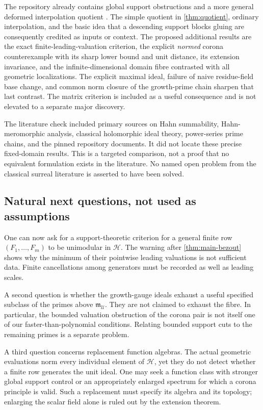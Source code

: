 \documentclass[11pt,letterpaper]{article}
\numberwithin{equation}{section}
\theoremstyle{definition}
\theoremstyle{remark}
\newcommand{\HH}{\mathcal H}
\newcommand{\UU}{\mathcal U}
\newcommand{\mm}{\mathfrak m}
\begin{document}
The repository already contains global support obstructions and a more
general deformed interpolation quotient \cite{RepoGlobal}. The simple
quotient in \cref{thm:quotient}, ordinary interpolation, and the basic
idea that a descending support blocks gluing are consequently credited
as inputs or context. The proposed additional results are the exact
finite-leading-valuation criterion, the explicit \emph{normed} corona
counterexample with its sharp lower bound and unit distance, its
extension invariance, and the infinite-dimensional domain fibre
contrasted with all geometric localizations. The explicit maximal
ideal, failure of naive residue-field base change, and common norm
closure of the growth-prime chain sharpen that last contrast. The matrix criterion is included as
a useful consequence and is not elevated to a separate major discovery.

The literature check included primary sources on Hahn summability,
Hahn-meromorphic analysis, classical holomorphic ideal theory,
power-series prime chains, and the pinned repository documents. It did
not locate these precise fixed-domain results. This is a targeted
comparison, not a proof that no equivalent formulation exists in the
literature. No named open problem from the classical surreal literature
is asserted to have been solved.

\subsection{Natural next questions, not used as assumptions}
One can now ask for a support-theoretic criterion for a general finite
row $(F_1,\ldots,F_m)$ to be unimodular in $\HH$. The warning after
\cref{thm:main-bezout} shows why the minimum of their pointwise leading
valuations is not sufficient data. Finite cancellations among generators
must be recorded as well as leading scales.

A second question is whether the growth-gauge ideals exhaust a useful
specified subclass of the primes above $\mm_\UU$. They are not claimed
to exhaust the fibre. In particular, the bounded valuation obstruction
of the corona pair is not itself one of our faster-than-polynomial
conditions. Relating bounded support cuts to the remaining primes is a
separate problem.

A third question concerns replacement function algebras. The actual
geometric evaluations norm every individual element of $\HH$, yet they
do not detect whether a finite row generates the unit ideal. One may
seek a function class with stronger global support control or an
appropriately enlarged spectrum for which a corona principle is valid.
Such a replacement must specify its algebra and its topology; enlarging
the scalar field alone is ruled out by the extension theorem.
\end{document}
